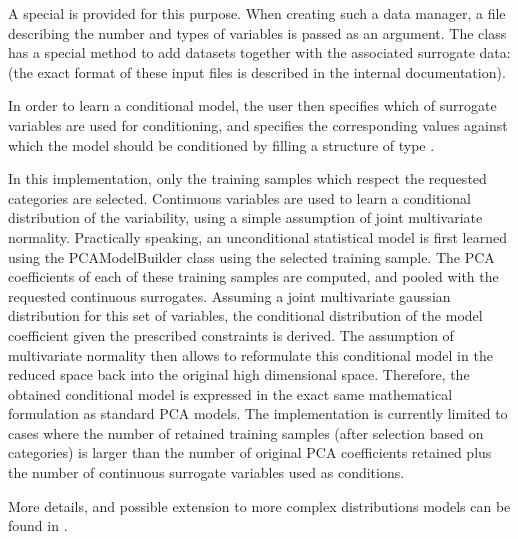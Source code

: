 \documentclass{InsightArticle}
\begin{document}
A special  is provided for this
purpose. When creating such a data manager, a file describing the
number and types of variables is passed as an argument.  The class has
a special method to add datasets together with the associated
surrogate data: 
(the exact format of these input files is described in the internal documentation).

In order to learn a conditional model, the user then specifies which
of surrogate variables are used for conditioning, and specifies the
corresponding values against which the model should be conditioned by
filling a structure of type .

In this implementation, only the training samples which respect the
requested categories are selected.  Continuous variables are used to
learn a conditional distribution of the variability, using a simple
assumption of joint multivariate normality. Practically speaking, an
unconditional statistical model is first learned using the
PCAModelBuilder class using the selected training sample. The PCA
coefficients of each of these training samples are computed, and
pooled with the requested continuous surrogates. Assuming a joint
multivariate gaussian distribution for this set of variables, the
conditional distribution of the model coefficient given the prescribed
constraints is derived. The assumption of multivariate normality then
allows to reformulate this conditional model in the reduced space back
into the original high dimensional space. Therefore, the obtained
conditional model is expressed in the exact same mathematical
formulation as standard PCA models.  The implementation is currently
limited to cases where the number of retained training samples (after
selection based on categories) is larger than the number of original
PCA coefficients retained plus the number of continuous surrogate
variables used as conditions.

More details, and possible extension to more complex distributions
models can be found in \cite{xxx}.
\end{document}
